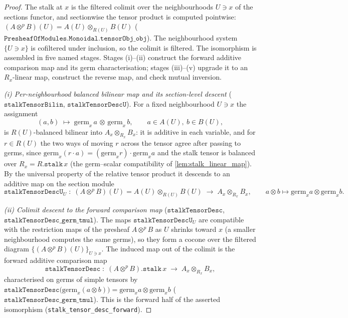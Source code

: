 \begin{proof}
  \leanok
  The stalk at \(x\) is the filtered colimit over the neighbourhoods \(U \ni x\) of
  the sections functor, and sectionwise the tensor product is computed pointwise:
  \((A \otimes^{p} B)(U) = A(U) \otimes_{R(U)} B(U)\)
  (\(\mathtt{PresheafOfModules.Monoidal.tensorObj\_obj}\)). The neighbourhood system
  \(\{U \ni x\}\) is cofiltered under inclusion, so the colimit is filtered. The
  isomorphism is assembled in five named stages. Stages (i)--(ii) construct the
  forward additive comparison map and its germ characterisation; stages (iii)--(v)
  upgrade it to an \(R_x\)-linear map, construct the reverse map, and check mutual
  inversion.

  \emph{(i) Per-neighbourhood balanced bilinear map and its section-level descent}
  (\(\mathtt{stalkTensorBilin}\), \(\mathtt{stalkTensorDescU}\)). For a fixed
  neighbourhood \(U \ni x\) the assignment
  \[
    (a, b) \;\longmapsto\; \mathrm{germ}_x\,a \,\otimes\, \mathrm{germ}_x\,b,
    \qquad a \in A(U),\ b \in B(U),
  \]
  is \(R(U)\)-balanced bilinear into \(A_x \otimes_{R_x} B_x\): it is additive in each
  variable, and for \(r \in R(U)\) the two ways of moving \(r\) across the tensor agree
  after passing to germs, since \(\mathrm{germ}_x(r \cdot a) = (\mathrm{germ}_x r)
  \cdot \mathrm{germ}_x a\) and the stalk tensor is balanced over
  \(R_x = R.\mathtt{stalk}\,x\) (the germ--scalar compatibility of
  \cref{lem:stalk_linear_map}). By the universal property of the relative tensor
  product it descends to an additive map on the section module
  \[
    \mathtt{stalkTensorDescU}_U \;\colon\;
      (A \otimes^{p} B)(U) = A(U) \otimes_{R(U)} B(U)
        \;\longrightarrow\; A_x \otimes_{R_x} B_x,
    \qquad a \otimes b \longmapsto \mathrm{germ}_x a \otimes \mathrm{germ}_x b.
  \]

  \emph{(ii) Colimit descent to the forward comparison map}
  (\(\mathtt{stalkTensorDesc}\), \(\mathtt{stalkTensorDesc\_germ\_tmul}\)). The
  maps \(\mathtt{stalkTensorDescU}_U\) are compatible with the restriction maps of the
  presheaf \(A \otimes^{p} B\) as \(U\) shrinks toward \(x\) (a smaller neighbourhood
  computes the same germs), so they form a cocone over the filtered diagram
  \(\{(A \otimes^{p} B)(U)\}_{U \ni x}\). The induced map out of the colimit is the
  forward additive comparison map
  \[
    \mathtt{stalkTensorDesc} \;\colon\;
      (A \otimes^{p} B).\mathtt{stalk}\,x \;\longrightarrow\; A_x \otimes_{R_x} B_x,
  \]
  characterised on germs of simple tensors by
  \(\mathtt{stalkTensorDesc}\bigl(\mathrm{germ}_x(a \otimes b)\bigr) =
  \mathrm{germ}_x a \otimes \mathrm{germ}_x b\)
  (\(\mathtt{stalkTensorDesc\_germ\_tmul}\)). This is the forward half of the asserted
  isomorphism (\texttt{stalk\_tensor\_desc\_forward}).


\end{proof}
